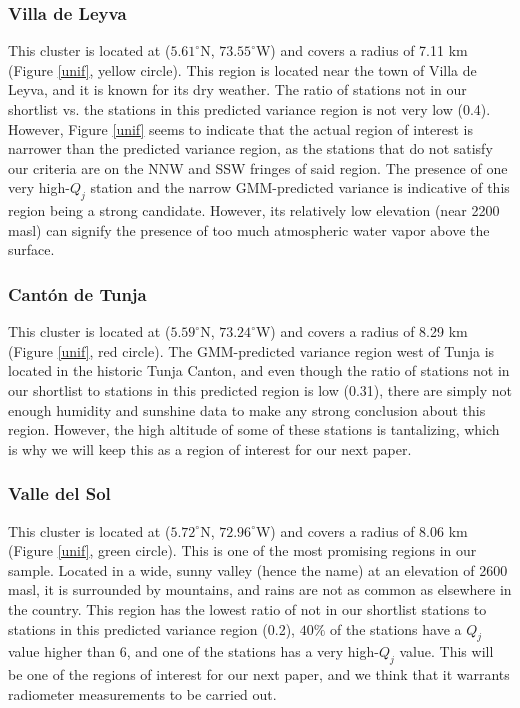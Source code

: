 \documentclass[12pt]{iopart}
\begin{document}
\subsubsection{Villa de Leyva}

This cluster is located at ($5.61^\circ$N, $73.55^\circ$W) and covers a radius of 7.11 km (Figure \ref{unif}, yellow circle). This region is located near the town of Villa de Leyva, and it is known for its dry weather.  The ratio of stations not in our shortlist vs. the stations in this predicted variance region is not very low (0.4). However, Figure \ref{unif} seems to indicate that the actual region of interest is narrower than the predicted variance region, as the stations that do not satisfy our criteria are on the NNW and SSW fringes of said region. The presence of one very high-$Q_j$ station and the narrow GMM-predicted variance is indicative of this region being a strong candidate. However, its relatively low elevation (near 2200 masl) can signify the presence of too much atmospheric water vapor above the surface. 


\subsubsection{Cant\'on de Tunja}

This cluster is located at ($5.59^\circ$N, $73.24^\circ$W) and covers a radius of 8.29 km (Figure \ref{unif}, red circle). The GMM-predicted variance region west of Tunja is located in the historic Tunja Canton, and even though the ratio of stations not in our shortlist to stations in this predicted region is low (0.31), there are simply not enough humidity and sunshine data to make any strong conclusion about this region. However, the high altitude of some of these stations is tantalizing, which is why we will keep this as a region of interest for our next paper.



\subsubsection{Valle del Sol}

This cluster is located at ($5.72^\circ$N, $72.96^\circ$W) and covers a radius of 8.06 km (Figure \ref{unif}, green circle). This is one of the most promising regions in our sample. Located in a wide, sunny valley (hence the name) at an elevation of 2600 masl, it is surrounded by mountains, and rains are not as common as elsewhere in the country. This region has the lowest ratio of not in our shortlist stations to stations in this predicted variance region (0.2), $40\%$ of the stations have a $Q_j$ value higher than 6, and one of the stations has a very high-$Q_j$ value. This will be one of the regions of interest for our next paper, and we think that it warrants radiometer measurements to be carried out.
\end{document}
